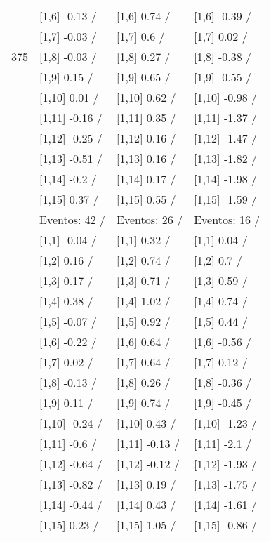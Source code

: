 \begin{table}
\begin{tabular}[t]{llll}
 & {}[1,6] -0.13  / & {}[1,6] 0.74  / & {}[1,6] -0.39  /\\
 & {}[1,7] -0.03  / & {}[1,7] 0.6  / & {}[1,7] 0.02  /\\
375 & {}[1,8] -0.03  / & {}[1,8] 0.27  / & {}[1,8] -0.38  /\\
\addlinespace
 & {}[1,9] 0.15  / & {}[1,9] 0.65  / & {}[1,9] -0.55  /\\
 & {}[1,10] 0.01  / & {}[1,10] 0.62  / & {}[1,10] -0.98  /\\
 & {}[1,11] -0.16  / & {}[1,11] 0.35  / & {}[1,11] -1.37  /\\
 & {}[1,12] -0.25  / & {}[1,12] 0.16  / & {}[1,12] -1.47  /\\
 & {}[1,13] -0.51  / & {}[1,13] 0.16  / & {}[1,13] -1.82  /\\
\addlinespace
 & {}[1,14] -0.2  / & {}[1,14] 0.17  / & {}[1,14] -1.98  /\\
 & {}[1,15] 0.37  / & {}[1,15] 0.55  / & {}[1,15] -1.59  /\\
 & Eventos:  42 / & Eventos:  26 / & Eventos:  16 /\\
 & {}[1,1] -0.04  / & {}[1,1] 0.32  / & {}[1,1] 0.04  /\\
 & {}[1,2] 0.16  / & {}[1,2] 0.74  / & {}[1,2] 0.7  /\\
\addlinespace
 & {}[1,3] 0.17  / & {}[1,3] 0.71  / & {}[1,3] 0.59  /\\
 & {}[1,4] 0.38  / & {}[1,4] 1.02  / & {}[1,4] 0.74  /\\
 & {}[1,5] -0.07  / & {}[1,5] 0.92  / & {}[1,5] 0.44  /\\
 & {}[1,6] -0.22  / & {}[1,6] 0.64  / & {}[1,6] -0.56  /\\
 & {}[1,7] 0.02  / & {}[1,7] 0.64  / & {}[1,7] 0.12  /\\
\addlinespace
500 & {}[1,8] -0.13  / & {}[1,8] 0.26  / & {}[1,8] -0.36  /\\
 & {}[1,9] 0.11  / & {}[1,9] 0.74  / & {}[1,9] -0.45  /\\
 & {}[1,10] -0.24  / & {}[1,10] 0.43  / & {}[1,10] -1.23  /\\
 & {}[1,11] -0.6  / & {}[1,11] -0.13  / & {}[1,11] -2.1  /\\
 & {}[1,12] -0.64  / & {}[1,12] -0.12  / & {}[1,12] -1.93  /\\
\addlinespace
 & {}[1,13] -0.82  / & {}[1,13] 0.19  / & {}[1,13] -1.75  /\\
 & {}[1,14] -0.44  / & {}[1,14] 0.43  / & {}[1,14] -1.61  /\\
 & {}[1,15] 0.23  / & {}[1,15] 1.05  / & {}[1,15] -0.86  /\\
\bottomrule
\end{tabular}
\end{table}
